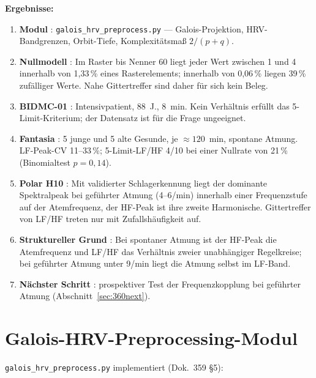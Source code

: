 \textbf{Ergebnisse:}
\begin{enumerate}
\item \textbf{Modul} \KM: \texttt{galois\_hrv\_preprocess.py} ---
  Galois-Projektion, HRV-Bandgrenzen, Orbit-Tiefe, Komplexitätsmaß
  $2/(p+q)$.
\item \textbf{Nullmodell} \KM: Im Raster bis Nenner 60 liegt jeder Wert
  zwischen 1 und 4 innerhalb von 1{,}33\,\% eines Rasterelements;
  innerhalb von 0{,}06\,\% liegen 39\,\% zufälliger Werte. Nahe
  Gittertreffer sind daher für sich kein Beleg.
\item \textbf{BIDMC-01} \LM: Intensivpatient, 88~J., 8~min. Kein
  Verhältnis erfüllt das 5-Limit-Kriterium; der Datensatz ist für die
  Frage ungeeignet.
\item \textbf{Fantasia} \LM: 5 junge und 5 alte Gesunde, je
  $\approx120$~min, spontane Atmung. LF-Peak-CV 11--33\,\%; 5-Limit-LF/HF
  4/10 bei einer Nullrate von 21\,\% (Binomialtest $p=0{,}14$).
\item \textbf{Polar H10} \KM: Mit validierter Schlagerkennung liegt der
  dominante Spektralpeak bei geführter Atmung (4--6/min) innerhalb einer
  Frequenzstufe auf der Atemfrequenz, der HF-Peak ist ihre zweite
  Harmonische. Gittertreffer von LF/HF treten nur mit Zufallshäufigkeit auf.
\item \textbf{Struktureller Grund} \BM: Bei spontaner Atmung ist der
  HF-Peak die Atemfrequenz und LF/HF das Verhältnis zweier unabhängiger
  Regelkreise; bei geführter Atmung unter 9/min liegt die Atmung selbst
  im LF-Band.
\item \textbf{Nächster Schritt} \SM: prospektiver Test der
  Frequenzkopplung bei geführter Atmung (Abschnitt~\ref{sec:360next}).
\end{enumerate}

\section{Galois-HRV-Preprocessing-Modul}

\texttt{galois\_hrv\_preprocess.py} implementiert (Dok.~359 §5):

